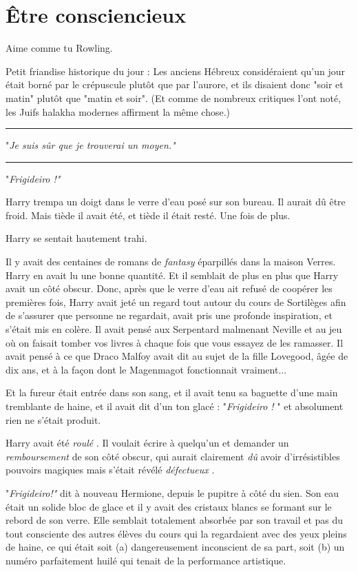 
\chapter{Être consciencieux}

Aime comme tu Rowling.

Petit friandise historique du jour : Les anciens Hébreux considéraient qu'un jour était borné par le crépuscule plutôt que par l'aurore, et ils disaient donc "soir et matin" plutôt que "matin et soir". (Et comme de nombreux critiques l'ont noté, les Juifs halakha modernes affirment la même chose.)
\par\noindent\rule{\textwidth}{0.4pt}
"\emph{Je suis sûr que je trouverai un moyen."} 
\par\noindent\rule{\textwidth}{0.4pt}
"\emph{Frigideiro !"} 

Harry trempa un doigt dans le verre d'eau posé sur son bureau. Il aurait dû être froid. Mais tiède il avait été, et tiède il était resté. Une fois de plus.

Harry se sentait hautement trahi.

Il y avait des centaines de romans de \emph{fantasy}  éparpillés dans la maison Verres. Harry en avait lu une bonne quantité. Et il semblait de plus en plus que Harry avait un côté obscur. Donc, après que le verre d'eau ait refusé de coopérer les premières fois, Harry avait jeté un regard tout autour du cours de Sortilèges afin de s'assurer que personne ne regardait, avait pris une profonde inspiration, et s'était mis en colère. Il avait pensé aux Serpentard malmenant Neville et au jeu où on faisait tomber vos livres à chaque fois que vous essayez de les ramasser. Il avait pensé à ce que Draco Malfoy avait dit au sujet de la fille Lovegood, âgée de dix ans, et à la façon dont le Magenmagot fonctionnait vraiment...

Et la fureur était entrée dans son sang, et il avait tenu sa baguette d'une main tremblante de haine, et il avait dit d'un ton glacé : "\emph{Frigideiro !} " et absolument rien ne s'était produit.

Harry avait été \emph{roulé} . Il voulait écrire à quelqu'un et demander un \emph{remboursement } de son côté obscur, qui aurait clairement \emph{dû}  avoir d'irrésistibles pouvoirs magiques mais s'était révélé \emph{défectueux} .

"\emph{Frigideiro!"}  dit à nouveau Hermione, depuis le pupitre à côté du sien. Son eau était un solide bloc de glace et il y avait des cristaux blancs se formant sur le rebord de son verre. Elle semblait totalement absorbée par son travail et pas du tout consciente des autres élèves du cours qui la regardaient avec des yeux pleins de haine, ce qui était soit (a) dangereusement inconscient de sa part, soit (b) un numéro parfaitement huilé qui tenait de la performance artistique.

